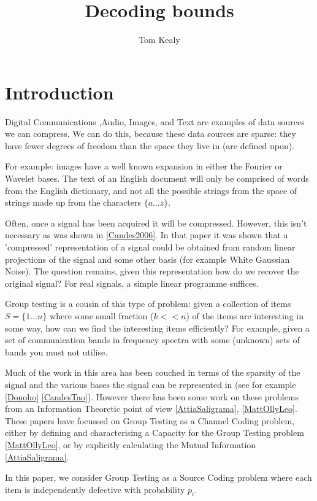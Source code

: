 \documentclass[11pt]{article}
\begin{document}
\title{Decoding bounds}
\author{Tom Kealy}

\section{Introduction}
Digital Communications ,Audio, Images, and Text are examples of data sources we can compress. We can do this, because these data sources are sparse: they have fewer degrees of freedom than the space they live in (are defined upon). 

For example: images have a well known expansion in either the Fourier or Wavelet bases. The text of an English document will only be comprised of words from the English dictionary, and not all the possible strings from the space of strings made up from the characters \(\{a \ldots z \}\). 

Often, once a signal has been acquired it will be compressed. However, this isn't necessary as was shown in \ref{Candes2006}. In that paper it was shown that a 'compressed' representation of a signal could be obtained from random linear projections of the signal and some other basis (for example White Gaussian Noise). The question remains, given this representation how do we recover the original signal? For real signals, a simple linear programme suffices.

Group testing is a cousin of this type of problem: given a collection of items \( S = \{1 \ldots n\}\) where some small fraction (\(k << n\)) of the items are interesting in some way, how can we find the interesting items efficiently? For example, given a set of communication bands in frequency spectra with some (unknown) sets of bands you must not utilise.

Much of the work in this area has been couched in terms of the sparsity of the signal and the various bases the signal can be represented in (see for example \ref{Donoho} \ref{CandesTao}). However there has been some work on these problems from an Information Theoretic point of view \ref{AttiaSaligrama}, \ref{MattOllyLeo}. These papers have focussed on Group Testing as a Channel Coding problem, either by defining and characterising a Capacity for the Group Testing problem \ref{MattOllyLeo}, or by explicitly calculating the Mutual Information \ref{AttiaSaligrama}.

In this paper, we consider Group Testing as a Source Coding problem where each item is independently defective with probability \(p_i\).


\end{document}
